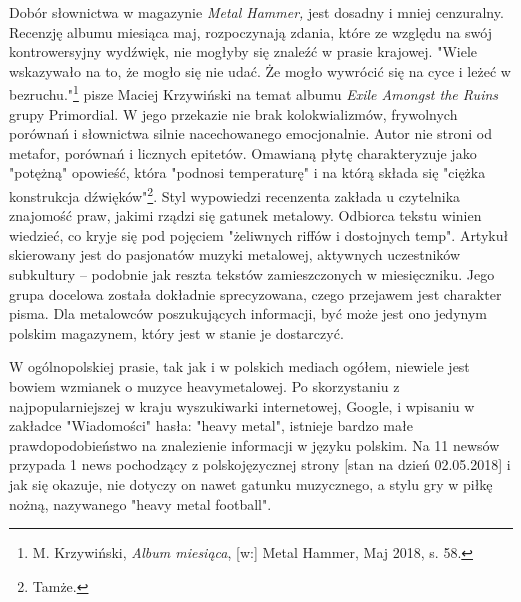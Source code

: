 \documentclass[12pt, a4paper, titlepage]{report}
\begin{document}
Dobór słownictwa w magazynie \textit{Metal Hammer,} jest dosadny i mniej cenzuralny. Recenzję albumu miesiąca maj, rozpoczynają zdania, które ze względu na swój kontrowersyjny wydźwięk, nie mogłyby się znaleźć w prasie krajowej. "Wiele wskazywało na to, że mogło się nie udać. Że mogło wywrócić się na cyce i leżeć w bezruchu."\footnote{M. Krzywiński, \textit{Album miesiąca}, [w:] Metal Hammer, Maj 2018, s. 58.} pisze Maciej Krzywiński na temat albumu \textit{Exile Amongst the Ruins} grupy Primordial. W jego przekazie nie brak kolokwializmów, frywolnych porównań i słownictwa silnie nacechowanego emocjonalnie. Autor nie stroni od metafor, porównań i licznych epitetów. Omawianą płytę charakteryzuje jako "potężną" opowieść, która "podnosi temperaturę" i na którą składa się "ciężka konstrukcja dźwięków"\footnote{Tamże.}. Styl wypowiedzi recenzenta zakłada u czytelnika znajomość praw, jakimi rządzi się gatunek metalowy. Odbiorca tekstu winien wiedzieć, co kryje się pod pojęciem "żeliwnych riffów i dostojnych temp". Artykuł skierowany jest do pasjonatów muzyki metalowej, aktywnych uczestników subkultury -- podobnie jak reszta tekstów zamieszczonych w miesięczniku. Jego grupa docelowa została dokładnie sprecyzowana, czego przejawem jest charakter pisma. Dla metalowców poszukujących informacji, być może jest ono jedynym polskim magazynem, który jest w stanie je dostarczyć.




W ogólnopolskiej prasie, tak jak i w polskich mediach ogółem, niewiele jest bowiem wzmianek o muzyce heavymetalowej. Po skorzystaniu z najpopularniejszej w kraju wyszukiwarki internetowej, Google, i wpisaniu w zakładce "Wiadomości" hasła: "heavy metal", istnieje bardzo małe prawdopodobieństwo na znalezienie informacji w języku polskim. Na 11 newsów przypada 1 news pochodzący z polskojęzycznej strony [stan na dzień 02.05.2018] i jak się okazuje, nie dotyczy on nawet gatunku muzycznego, a stylu gry w piłkę nożną, nazywanego "heavy metal football".
\end{document}
